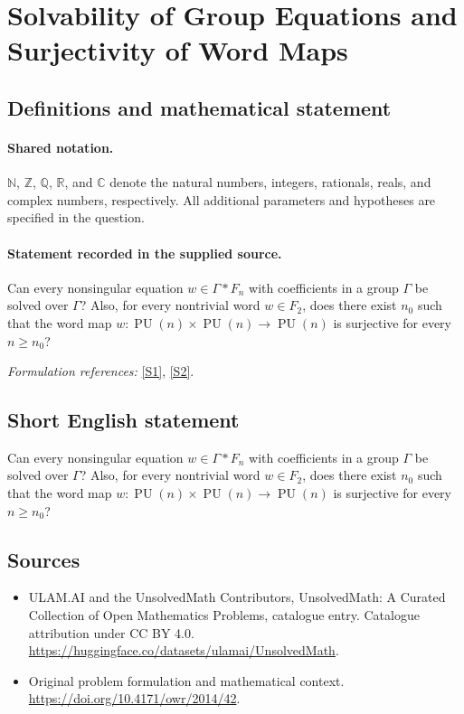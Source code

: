 \documentclass[11pt]{article}
\newcommand{\sref}[2]{\hyperlink{source:#1:#2}{[S#2]}}
\begin{document}
\section{Solvability of Group Equations and Surjectivity of Word Maps}\label{statement}

\subsection{Definitions and mathematical statement}

\paragraph{Shared notation.}$\mathbb N$, $\mathbb Z$, $\mathbb Q$, $\mathbb R$, and $\mathbb C$ denote the natural numbers, integers, rationals, reals, and complex numbers, respectively. All additional parameters and hypotheses are specified in the question.


\paragraph{Statement recorded in the supplied source.}
Can every nonsingular equation $w\in\Gamma*F_n$ with coefficients in a group $\Gamma$ be solved over $\Gamma$? Also, for every nontrivial word $w\in F_2$, does there exist $n_0$ such that the word map $w:\operatorname{PU}(n)\times\operatorname{PU}(n)\to\operatorname{PU}(n)$ is surjective for every $n\geq n_0$?
\par\smallskip\textit{Formulation references:} \sref{statement}{1}, \sref{statement}{2}.
\subsection{Short English statement}
Can every nonsingular equation $w\in\Gamma*F_n$ with coefficients in a group $\Gamma$ be solved over $\Gamma$? Also, for every nontrivial word $w\in F_2$, does there exist $n_0$ such that the word map $w:\operatorname{PU}(n)\times\operatorname{PU}(n)\to\operatorname{PU}(n)$ is surjective for every $n\geq n_0$?
\subsection{Sources}
\begin{itemize}
\item[\hypertarget{source:statement:1}{S1}] ULAM.AI and the UnsolvedMath Contributors, UnsolvedMath: A Curated Collection of Open Mathematics Problems, catalogue entry. Catalogue attribution under CC BY 4.0.
\url{https://huggingface.co/datasets/ulamai/UnsolvedMath}.
\item[\hypertarget{source:statement:2}{S2}] Original problem formulation and mathematical context.
\url{https://doi.org/10.4171/owr/2014/42}.
\end{itemize}
\label{end:statement}
\end{document}
